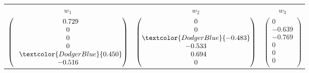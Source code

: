 \begin{enumerate}[1),leftmargin=*]
\begin{center}
  \begin{tabular}{ccc}
    $w_1$ & $w_2$ & $w_3$ \\
    $\begin{pmatrix}
      \phantom{-}0.729 \\
      0    \\
      0    \\
      0    \\
      \phantom{-}\textcolor{DodgerBlue}{0.450} \\
      -0.516 \\
    \end{pmatrix}$ &
    $\begin{pmatrix}
      0    \\
      0    \\
      \textcolor{DodgerBlue}{-0.483} \\
      -0.533 \\
      \phantom{-}0.694 \\
      0    \\
    \end{pmatrix}$ &
    $\begin{pmatrix}
      0    \\
      -0.639 \\
      -0.769 \\
      0    \\
      0    \\
      0    \\
    \end{pmatrix}$
  \end{tabular}
\end{center}


\end{enumerate}
